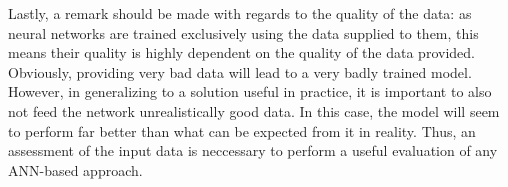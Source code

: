 Lastly, a remark should be made with regards to the quality of the data: as neural networks are trained exclusively using the data supplied to them, this means their quality is highly dependent on the quality of the data provided. Obviously, providing very bad data will lead to a very badly trained model. However, in generalizing to a solution useful in practice, it is important to also not feed the network unrealistically good data. In this case, the model will seem to perform far better than what can be expected from it in reality. Thus, an assessment of the input data is neccessary to perform a useful evaluation of any ANN-based approach.
